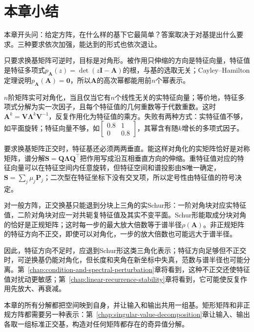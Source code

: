 \FloatBarrier
\section{本章小结}
\label{sec:eigen-spectral-decomposition-summary}

本章开头问：给定方阵，在什么样的基下它最简单？答案取决于对基提出什么要求。三种要求依次加强，能达到的形式也依次退让。

只要求换基矩阵可逆时，目标是对角形。被作用只伸缩的方向是特征向量，特征值是特征多项式$p_{\bm A}(z)=\det(z\bm I-\bm A)$的根，与基的选取无关；Cayley--Hamilton定理说明$p_{\bm A}(\bm A)=\bm0$，所以$\bm A$的高次幂都能用前$n$个幂表示。

$n$阶矩阵实可对角化，当且仅当它有$n$个线性无关的实特征向量；等价地，特征多项式分解为实一次因子，且每个特征值的几何重数等于代数重数。这时$\bm A^k=\bm V\bm\Lambda^k\bm V^{-1}$，反复作用化为特征值的乘方。失败有两种方式：实特征值不够，如平面旋转；特征向量不够，如$\left[\begin{smallmatrix}0.8&1\\0&0.8\end{smallmatrix}\right]$，其幂含有随$k$增长的多项式因子。

要求换基矩阵正交时，特征基还必须两两垂直。能这样对角化的实矩阵恰好是对称矩阵，谱分解$\bm S=\bm Q\bm\Lambda\bm Q^\top$把作用写成沿互相垂直方向的伸缩。重特征值对应的特征向量可以在特征空间内任意旋转，但特征空间和谱投影由$\bm S$唯一确定，$\bm S=\sum_j\mu_j\bm P_j$；二次型在特征坐标下没有交叉项，所以定号性由特征值的符号决定。

对一般方阵，正交换基只能退到分块上三角的实Schur形：一阶对角块对应实特征值，二阶对角块对应一对共轭复特征值及其实不变平面。Schur形能取成分块对角的恰好是正规矩阵；这时每一步的最大放大倍数等于谱半径$\rho(\bm A)$。非正规矩阵的特征方向不正交，即使可以对角化，一步的放大倍数也可能远大于谱半径。

因此，特征方向不足时，应退到Schur形这类三角化表示；特征方向足够但不正交时，可逆换基仍能对角化，但长度和夹角在新坐标中失真，范数与谱半径也可能分离。第~\ref{chap:condition-and-spectral-perturbation}章将看到，这种不正交还使特征值对扰动更敏感；第~\ref{chap:linear-recurrence-stability}章将看到，它可能使反复作用先放大、再衰减。

本章的所有分解都把空间映到自身，并让输入和输出共用一组基。矩形矩阵和非正规方阵都需要另一种表示：第~\ref{chap:singular-value-decomposition}章让输入、输出各取一组标准正交基，构造对任何矩阵都存在的奇异值分解。

